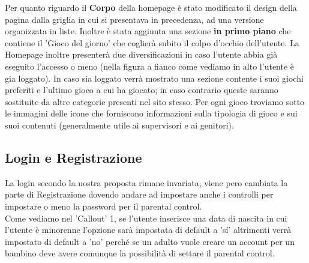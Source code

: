 \documentclass[../Report.tex]{subfiles}
\begin{document}
         Per quanto riguardo il \textbf{Corpo} della homepage  è stato modificato il design della pagina dalla griglia in cui si presentava in precedenza, ad una versione organizzata in liste.
         Inoltre è stata aggiunta una sezione \textbf{in primo piano} che contiene il 'Gioco del giorno' che coglierà subito il colpo d'occhio dell'utente.
         La Homepage inoltre presenterà due diversificazioni in caso l'utente abbia già eseguito l'accesso o meno (nella figura a fianco come vediamo in alto l'utente è gia loggato).
         In caso sia loggato verrà mostrato una sezione contente i suoi giochi preferiti e l'ultimo gioco a cui ha giocato; in caso contrario queste saranno sostituite da altre categorie presenti nel sito stesso.
         Per ogni gioco troviamo sotto le immagini delle icone che forniscono informazioni sulla tipologia di gioco e sui suoi contenuti (generalmente utile ai supervisori e ai genitori).
         


    \subsection{Login e Registrazione}
    La login secondo la nostra proposta rimane invariata, viene pero cambiata la parte di Registrazione dovendo andare ad impostare anche i controlli per impostare o meno la password per il parental control.\\
    Come vediamo nel 'Callout' 1, se l'utente inserisce una data di nascita in cui l'utente è minorenne l'opzione sarà impostata di default a 'sí' altrimenti verrà impostato di default a 'no' perché se un adulto vuole creare un account per un bambino deve avere comunque la possibilità di settare il parental control.
\end{document}
